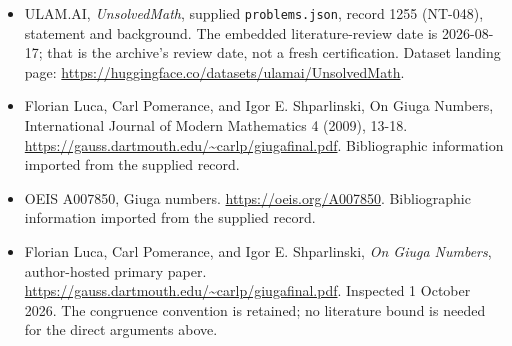 \documentclass[11pt,a4paper]{article}
\begin{document}
{\small

\begin{itemize}

\item[\hypertarget{source:1255:1}{S1}] ULAM.AI, \emph{UnsolvedMath}, supplied \texttt{problems.json}, record 1255 (NT-048), statement and background. The embedded literature-review date is 2026-08-17; that is the archive’s review date, not a fresh certification. Dataset landing page: \url{https://huggingface.co/datasets/ulamai/UnsolvedMath}.

\item[\hypertarget{source:1255:2}{S2}] Florian Luca, Carl Pomerance, and Igor E. Shparlinski, On Giuga Numbers, International Journal of Modern Mathematics 4 (2009), 13-18. \url{https://gauss.dartmouth.edu/~carlp/giugafinal.pdf}. Bibliographic information imported from the supplied record.

\item[\hypertarget{source:1255:3}{S3}] OEIS A007850, Giuga numbers. \url{https://oeis.org/A007850}. Bibliographic information imported from the supplied record.


\item[E1] Florian Luca, Carl Pomerance, and Igor E. Shparlinski,
\emph{On Giuga Numbers}, author-hosted primary paper.
\url{https://gauss.dartmouth.edu/~carlp/giugafinal.pdf}.
Inspected 1 October 2026. The congruence convention is retained; no
literature bound is needed for the direct arguments above.

\end{itemize}

}

\label{end:1255}
\end{document}
